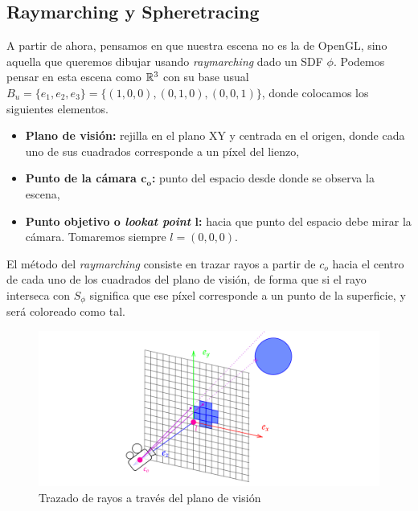 \subsection{Raymarching y Spheretracing}
A partir de ahora, pensamos en que nuestra escena no es la de OpenGL, sino aquella que queremos dibujar usando \textit{raymarching} dado un SDF $\phi$. Podemos pensar en esta escena como $\mathbb{R}^3$ con su base usual $B_u = \{e_1,e_2,e_3\} = \{(1,0,0),(0,1,0),(0,0,1)\}$, donde colocamos los siguientes elementos.
\begin{itemize}
    \item \textbf{Plano de visión:} rejilla en el plano XY y centrada en el origen, donde cada uno de sus cuadrados corresponde a un píxel del lienzo,
    \item \textbf{Punto de la cámara $\boldsymbol{c_o}$:} punto del espacio desde donde se observa la escena,
    \item \textbf{Punto objetivo o \textit{lookat point} $\boldsymbol{l}$:} hacia que punto del espacio debe mirar la cámara. Tomaremos siempre $l=(0,0,0)$.
\end{itemize}

El método del \textit{raymarching} consiste en trazar rayos a partir de $c_o$ hacia el centro de cada uno de los cuadrados del plano de visión, de forma que si el rayo interseca con $S_\phi$ significa que ese píxel corresponde a un punto de la superficie, y será coloreado como tal.
\begin{figure}[h]
    \centering
    \includegraphics[width=\textwidth]{Plantilla-TFG-master/img/raymarch.png}
    \caption{Trazado de rayos a través del plano de visión}
    \label{fig:raymarch1}
\end{figure}
\newline

